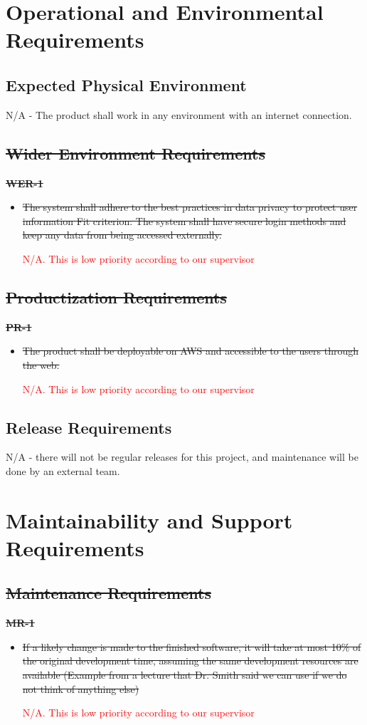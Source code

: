 \documentclass[12pt]{article}
\begin{document}
\section{Operational and Environmental Requirements}
\subsection{Expected Physical Environment}
N/A - The product shall work in any environment with an internet connection.

\subsection{\sout{Wider Environment Requirements}}

\textbf{\sout{WER-1}}
\begin{itemize}
    \item \sout{The system shall adhere to the best practices in data privacy to protect user information \hfill \break
    Fit criterion: The system shall have secure login methods and keep any data from being accessed externally.}

    \textcolor{red}{N/A. This is low priority according to our supervisor}
\end{itemize}

\subsection{\sout{Productization Requirements}}
\textbf{\sout{PR-1}}
\begin{itemize}
    \item \sout{The product shall be deployable on AWS and accessible to the users through the web.}

    \textcolor{red}{N/A. This is low priority according to our supervisor}
\end{itemize}

\subsection{Release Requirements}
N/A - there will not be regular releases for this project, and maintenance will be done by an external team.

\section{Maintainability and Support Requirements}
\subsection{\sout{Maintenance Requirements}}
\textbf{\sout{MR-1}}
\begin{itemize}
    \item \sout{If a likely change is made to the finished software, it will take at most 10\% of the original development time, assuming the same development resources are available (Example from a lecture that Dr. Smith said we can use if we do not think of anything else)}

    \textcolor{red}{N/A. This is low priority according to our supervisor}
\end{itemize}
\end{document}
